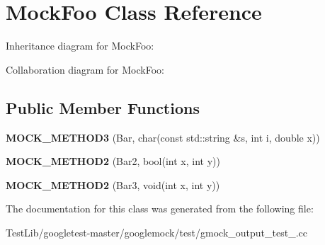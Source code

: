 \hypertarget{classMockFoo}{}\section{Mock\+Foo Class Reference}
\label{classMockFoo}


Inheritance diagram for Mock\+Foo\+:


Collaboration diagram for Mock\+Foo\+:
\subsection*{Public Member Functions}
\begin{DoxyCompactItemize}
\item 
\mbox{\label{classMockFoo_a8f323a65afd93c0605a02b278b101d18}} 
{\bfseries M\+O\+C\+K\+\_\+\+M\+E\+T\+H\+O\+D3} (Bar, char(const std\+::string \&s, int i, double x))
\item 
\mbox{\label{classMockFoo_ae1d53263d5efcf38fda3990302fac6ab}} 
{\bfseries M\+O\+C\+K\+\_\+\+M\+E\+T\+H\+O\+D2} (Bar2, bool(int x, int y))
\item 
\mbox{\label{classMockFoo_af1e0c374cadacdaa7ca69f9c38d85543}} 
{\bfseries M\+O\+C\+K\+\_\+\+M\+E\+T\+H\+O\+D2} (Bar3, void(int x, int y))
\end{DoxyCompactItemize}


The documentation for this class was generated from the following file\+:\begin{DoxyCompactItemize}
\item 
Test\+Lib/googletest-\/master/googlemock/test/gmock\+\_\+output\+\_\+test\+\_\+.\+cc\end{DoxyCompactItemize}
